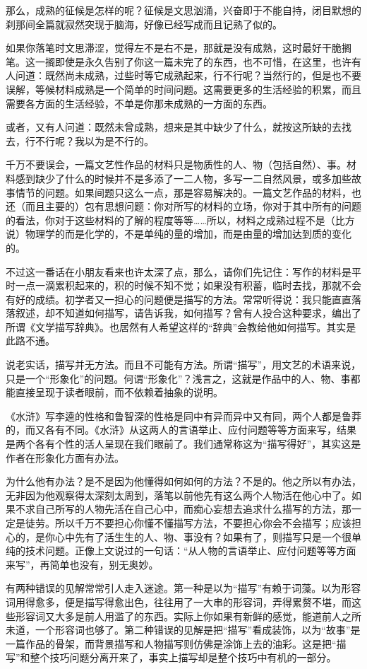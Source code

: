 \documentclass[12pt,a5paper]{ctexbook}
\begin{document}
那么，成熟的征候是怎样的呢？征候是文思汹涌，兴奋即于不能自持，闭目默想的刹那间全篇就寂然突现于脑海，好像已经写成而且记熟了似的。

如果你落笔时文思滞涩，觉得左不是右不是，那就是没有成熟，这时最好干脆搁笔。这一搁即使是永久告别了你这一篇未完了的东西，也不可惜，在这里，也许有人问道：既然尚未成熟，过些时等它成熟起来，行不行呢？当然行的，但是也不要误解，等候材料成熟是一个简单的时间问题。这需要更多的生活经验的积累，而且需要各方面的生活经验，不单是你那未成熟的一方面的东西。

或者，又有人问道：既然未曾成熟，想来是其中缺少了什么，就按这所缺的去找去，行不行呢？我以为是不行的。

千万不要误会，一篇文艺性作品的材料只是物质性的人、物（包括自然）、事。材料感到缺少了什么的时候并不是多添了一二人物，多写一二自然风景，或多加些故事情节的问题。如果间题只这么一点，那是容易解决的。一篇文艺作品的材料，也还（而且主要的）包有思想问题：你对所写的材料的立场，你对于其中所有的问题的看法，你对于这些材料的了解的程度等等……所以，材料之成熟过程不是（比方说）物理学的而是化学的，不是单纯的量的增加，而是由量的增加达到质的变化的。

不过这一番话在小朋友看来也许太深了点，那么，请你们先记住：写作的材料是平时一点一滴累积起来的，积的时候不知不觉；如果没有积蓄，临时去找，那就不会有好的成绩。初学者又一担心的问题便是描写的方法。常常听得说：我只能直直落落叙述，却不知道如何描写，请告诉我，如何描写？曾有人投合这种要求，编出了所谓《文学描写辞典》。也居然有人希望这样的“辞典”会教给他如何描写。其实是此路不通。

说老实话，描写并无方法。而且不可能有方法。所谓“描写”，用文艺的术语来说，只是一个“形象化”的问题。何谓“形象化”？浅言之，这就是作品中的人、物、事都能直接呈现于读者眼前，而不依赖着抽象的说明。

《水浒》写李逵的性格和鲁智深的性格是同中有异而异中又有同，两个人都是鲁莽的，而又各有不同。《水浒》从这两人的言语举止、应付问题等等方面来写，结果是两个各有个性的活人呈现在我们眼前了。我们通常称这为“描写得好”，其实这是作者在形象化方面有办法。

为什么他有办法？是不是因为他懂得如何如何的方法？不是的。他之所以有办法，无非因为他观察得太深刻太周到，落笔以前他先有这么两个人物活在他心中了。如果不求自己所写的人物先活在自己心中，而痴心妄想去追求什么描写的方法，那一定是徒劳。所以千万不要担心你懂不懂描写方法，不要担心你会不会描写；应该担心的，是你心中先有了活生生的人、物、事没有？如果有了，则描写只是一个很单纯的技术问题。正像上文说过的一句话：“从人物的言语举止、应付问题等等方面来写”，再简单也没有，别无奥妙。

有两种错误的见解常常引人走入迷途。第一种是以为“描写”有赖于词藻。以为形容词用得愈多，便是描写得愈出色，往往用了一大串的形容词，弄得累赘不堪，而这些形容词又大多是前人用滥了的东西。实际上你如果有新鲜的感觉，能道前人之所未道，一个形容词也够了。第二种错误的见解是把“描写”看成装饰，以为“故事”是一篇作品的骨架，而背景描写和人物描写则仿佛是涂饰上去的油彩。这是把“描写”和整个技巧问题分离开来了，事实上描写却是整个技巧中有机的一部分。
\end{document}
